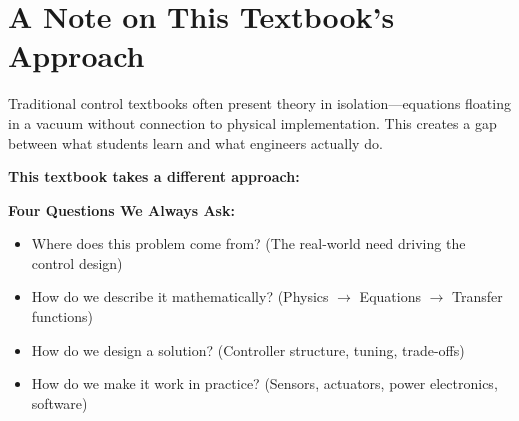\section{A Note on This Textbook's Approach}
Traditional control textbooks often present theory in isolation---equations floating in a vacuum without connection to physical implementation. This creates a gap between what students learn and what engineers actually do.

\textbf{This textbook takes a different approach:}

\begin{center}
\end{center}

\textbf{Four Questions We Always Ask:}
\begin{itemize}
    \item Where does this problem come from? (The real-world need driving the control design)
    \item How do we describe it mathematically? (Physics $\rightarrow$ Equations $\rightarrow$ Transfer functions)
    \item How do we design a solution? (Controller structure, tuning, trade-offs)
    \item How do we make it work in practice? (Sensors, actuators, power electronics, software)
\end{itemize}

